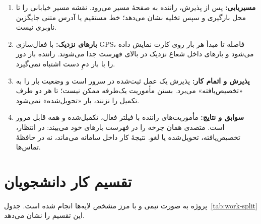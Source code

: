 \begin{enumerate}
  \item \textbf{مسیریابی:} پس از پذیرش، راننده به صفحهٔ مسیر می‌رود. نقشه مسیر خیابانی را تا محل بارگیری و سپس تخلیه نشان می‌دهد؛ خط مستقیم یا آدرس متنی جایگزین ناوبری نیست.
  \item \textbf{بارهای نزدیک:} با فعال‌سازی \textenglish{GPS}، فاصله تا مبدأ هر بار روی کارت نمایش داده می‌شود و بارهای داخل شعاع نزدیک در بالای فهرست جدا می‌شوند. راننده بار دور را با بار دمِ دست اشتباه نمی‌گیرد.
  \item \textbf{پذیرش و اتمام کار:} پذیرش یک عمل ثبت‌شده در سرور است و وضعیت بار را به «تخصیص‌یافته» می‌برد. بستن مأموریت یک‌طرفه ممکن نیست؛ تا هر دو طرف تکمیل را نزنند، بار «تحویل‌شده» نمی‌شود.
  \item \textbf{سوابق و نتایج:} مأموریت‌های راننده با فیلتر فعال، تکمیل‌شده و همه قابل مرور است. متصدی همان چرخه را در فهرست بارهای خود می‌بیند: در انتظار، تخصیص‌یافته، تحویل‌شده یا لغو. نتیجهٔ کار داخل سامانه می‌ماند، نه در حافظهٔ تماس‌ها.
\end{enumerate}

\section{تقسیم کار دانشجویان}

پروژه به صورت تیمی و با مرز مشخص لایه‌ها انجام شده است. جدول~\ref{tab:work-split} این تقسیم را نشان می‌دهد.

\begin{table}[ht]
\centering
\caption{تقسیم مسئولیت در پروژه}
\label{tab:work-split}
\vspace{2pt}
\end{table}

